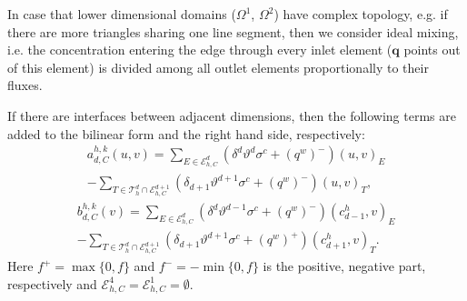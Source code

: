 \documentclass[a4paper]{article}
\def\Ehcom{\mathcal E_{h,C}}         %
\def\vc#1{\mathbf{\boldsymbol{#1}}}     %
\def\sc#1#2{\left(#1,#2\right)}
\def\Th{\mathcal T_h}       %
\def\th{\vartheta}
\begin{document}
In case that lower dimensional domains ($\Omega^1$, $\Omega^2$) have complex topology, e.g. if there are more triangles sharing one line segment, then we consider ideal mixing, i.e. the concentration entering the edge through every inlet element ($\vc q$ points out of this element) is divided among all outlet elements proportionally to their fluxes.

If there are interfaces between adjacent dimensions, then the following terms are added to the bilinear form and the right hand side, respectively:
\begin{multline*}
a^{h,k}_{d,C}(u,v) = \sum_{E\in\Ehcom^d} (\delta^d\th^d\sigma^c+(q^w)^-)\sc{u}{v}_E\\
- \sum_{T\in\Th^d\cap\Ehcom^{d+1}} (\delta_{d+1}\th^{d+1}\sigma^c+(q^w)^-)\sc{u}{v}_T,
\end{multline*}
\begin{multline*}
b^{h,k}_{d,C}(v) = \sum_{E\in\Ehcom^d} (\delta^d\th^{d-1}\sigma^c+(q^w)^-)\sc{c^h_{d-1}}{v}_E\\
- \sum_{T\in\Th^d\cap\Ehcom^{d+1}} (\delta_{d+1}\th^{d+1}\sigma^c+(q^w)^+)\sc{c^h_{d+1}}{v}_T.
\end{multline*}
Here $f^+=\max\{0,f\}$ and $f^-=-\min\{0,f\}$ is the positive, negative part, respectively and $\Ehcom^4=\Ehcom^1=\emptyset$.
\end{document}
